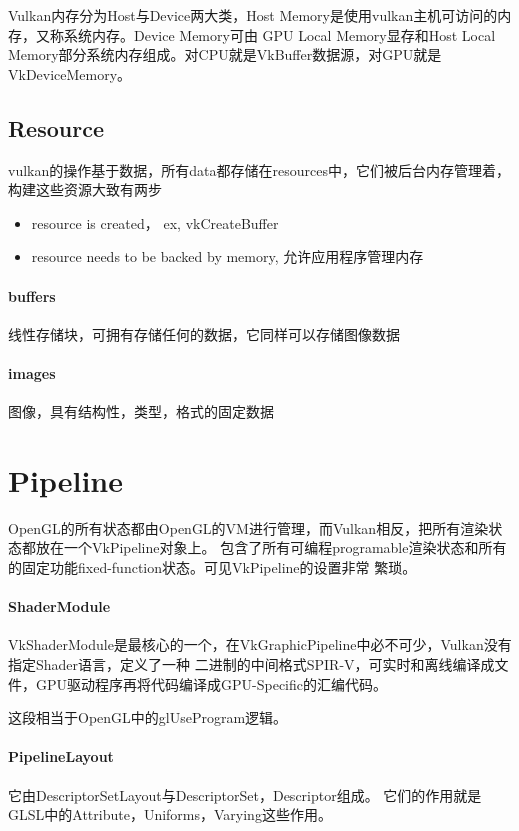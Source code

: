 Vulkan内存分为Host与Device两大类，Host Memory是使用vulkan主机可访问的内存，又称系统内存。Device Memory可由
GPU Local Memory显存和Host Local Memory部分系统内存组成。对CPU就是VkBuffer数据源，对GPU就是
VkDeviceMemory。

\subsection{Resource}

vulkan的操作基于数据，所有data都存储在resources中，它们被后台内存管理着，构建这些资源大致有两步
\begin{itemize}
    \item {resource is created， ex, vkCreateBuffer}
    \item {resource needs to be backed by memory, 允许应用程序管理内存}
\end{itemize}

\paragraph{buffers}

线性存储块，可拥有存储任何的数据，它同样可以存储图像数据

\paragraph{images}

图像，具有结构性，类型，格式的固定数据


\section{Pipeline}
OpenGL的所有状态都由OpenGL的VM进行管理，而Vulkan相反，把所有渲染状态都放在一个VkPipeline对象上。
包含了所有可编程programable渲染状态和所有的固定功能fixed-function状态。可见VkPipeline的设置非常
繁琐。

\paragraph{ShaderModule}
VkShaderModule是最核心的一个，在VkGraphicPipeline中必不可少，Vulkan没有指定Shader语言，定义了一种
二进制的中间格式SPIR-V，可实时和离线编译成文件，GPU驱动程序再将代码编译成GPU-Specific的汇编代码。

这段相当于OpenGL中的glUseProgram逻辑。

\paragraph{PipelineLayout}
它由DescriptorSetLayout与DescriptorSet，Descriptor组成。
它们的作用就是GLSL中的Attribute，Uniforms，Varying这些作用。


